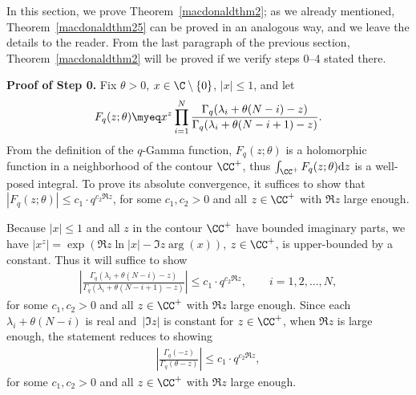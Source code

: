In this section, we prove Theorem~\ref{macdonaldthm2}; as we already mentioned, Theorem~\ref{macdonaldthm25} can be proved in an analogous way, and we leave the details to the reader. From the last paragraph of the previous section, Theorem~\ref{macdonaldthm2} will be proved if we verify steps 0--4 stated there.

\textbf{Proof of Step 0.} Fix $\theta>0$, $x\in\C \setminus \{0\}$, $|x|\leq 1$, and let
\begin{gather*}
F_q(z; \theta) \myeq x^z\prod\limits_{i=1}^N{\frac{\Gamma_q(\lambda_i + \theta(N-i) - z)}{\Gamma_q(\lambda_i + \theta(N-i+1) - z)}}.
 \end{gather*} From the def\/inition of the $q$-Gamma function, $F_q(z; \theta)$ is a holomorphic function in a neighborhood of the contour $\CC^+$, thus $\int_{\CC^+}{F_q(z; \theta){\rm d}z}$ is a well-posed integral. To prove its absolute convergence, it suf\/f\/ices to show that $|F_q(z; \theta)| \leq c_1\cdot q^{c_2 \Re z}$, for some $c_1, c_2 > 0$ and all $z\in\CC^+$ with $\Re z$ large enough.

Because $|x|\leq 1$ and all $z$ in the contour $\CC^+$ have bounded imaginary parts, we have $|x^z| = \exp(\Re z \ln{|x|} - \Im z \arg(x))$, $z\in\CC^+$, is upper-bounded by a constant. Thus it will suf\/f\/ice to show
\begin{gather*}
\left|\frac{\Gamma_q(\lambda_i + \theta(N - i) - z)}{\Gamma_q(\lambda_i + \theta(N - i + 1) - z)}\right| \leq c_1\cdot q^{c_2 \Re z}, \qquad i = 1, 2, \dots, N,
\end{gather*}
for some $c_1, c_2 > 0$ and all $z\in\CC^+$ with $\Re z$ large enough. Since each $\lambda_i + \theta(N-i)$ is real and~$|\Im z|$ is constant for $z\in\CC^+$, when $\Re z$ is large enough, the statement reduces to showing
\begin{gather}\label{toproveineqgamma}
\left|\frac{\Gamma_q(- z)}{\Gamma_q(\theta - z)}\right| \leq c_1\cdot q^{c_2 \Re z},
\end{gather}
for some $c_1, c_2 > 0$ and all $z\in\CC^+$ with $\Re z$ large enough.

